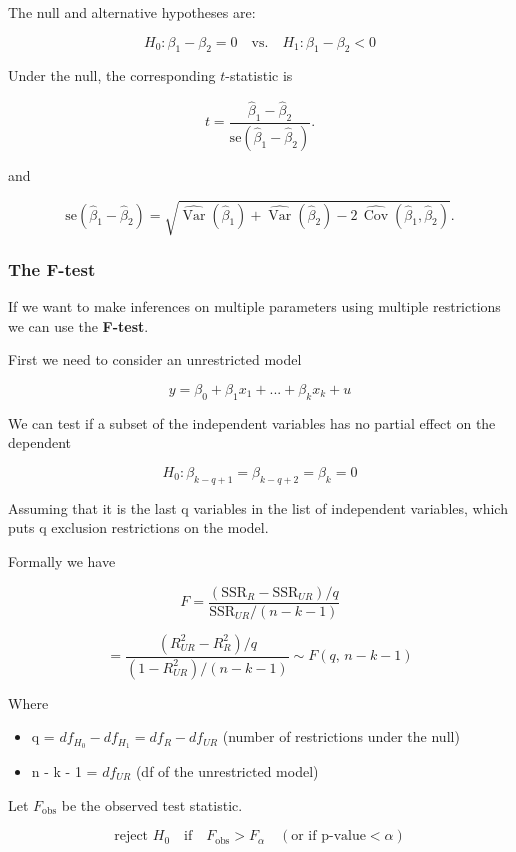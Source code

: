 The null and alternative hypotheses are:

\[
H_0 : \beta_1 - \beta_2 = 0 \quad \text{vs.} \quad H_1 : \beta_1 - \beta_2 < 0
\]

Under the null, the corresponding $t$-statistic is

\[
t = \frac{\hat{\beta}_1 - \hat{\beta}_2}{\text{se}(\hat{\beta}_1 - \hat{\beta}_2)}.
\]

and 

\[
\text{se}(\hat{\beta}_1 - \hat{\beta}_2) 
= \sqrt{
    \widehat{\operatorname{Var}}(\hat{\beta}_1)
    + \widehat{\operatorname{Var}}(\hat{\beta}_2)
    - 2 \, \widehat{\operatorname{Cov}}(\hat{\beta}_1, \hat{\beta}_2)
}.
\]


\subsubsection{The F-test}

If we want to make inferences on multiple parameters using multiple restrictions
we can use the \textbf{F-test}.

First we need to consider an unrestricted model

\[
y = \beta_0 +\beta_1 x_1 +...+\beta_k x_k +u
\]

We can test if a subset of the independent variables has no partial effect on the dependent

\[
H_0 : \beta_{k-q+1} = \beta_{k-q+2} = \beta_k = 0
\]


Assuming that it is the last q variables in the list of independent
variables, which puts q exclusion restrictions on the model.

Formally we have

\[
F = 
\frac{(\text{SSR}_R - \text{SSR}_{UR})/q}{\text{SSR}_{UR}/(n - k - 1)}
\]

\[
=
\frac{(R^2_{UR} - R^2_{R})/q}{(1 - R^2_{UR})/(n - k - 1)}
\sim F(q,\, n-k-1)
\]


Where

\begin{itemize}
    \item q = $df_{H_0} - df_{H_1} = df_R - df_{UR}$ (number of restrictions under the null)
    \item n - k - 1 = $df_{UR}$ (df of the unrestricted model)
\end{itemize}


Let $F_{\text{obs}}$ be the observed test statistic.

\[
\text{reject } H_0 \quad \text{if} \quad F_{\text{obs}} > F_{\alpha}
\quad (\text{or if p-value} < \alpha)
\]

